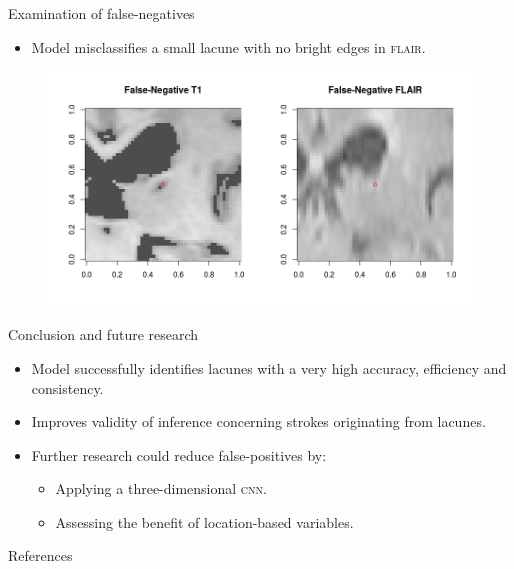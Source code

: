 \documentclass{beamer}
\begin{document}
\begin{frame}{Examination of false-negatives}
\begin{itemize}
\item Model misclassifies a small lacune with no bright edges in \textsc{flair}.
\end{itemize}
\begin{figure}
\centering
\includegraphics[width=\linewidth]{../Thesis_Docs/Images/7_FN_t1_flair.png}
\end{figure}
\end{frame}


\begin{frame}{Conclusion and future research}
\begin{itemize}
\item Model successfully identifies lacunes with a very high accuracy, efficiency and consistency.
\item Improves validity of inference concerning strokes originating from lacunes.
\item Further research could reduce false-positives by:
\begin{itemize}
\item Applying a three-dimensional \textsc{cnn}.
\item Assessing the benefit of location-based variables.
\end{itemize}
\end{itemize}

\end{frame}


\begin{frame}[allowframebreaks]{References}
	
	
\end{frame}
\end{document}
